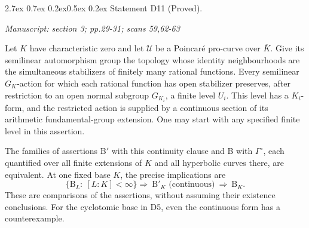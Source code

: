 \documentclass[11pt,a4paper]{article}
\makeatletter
\newcommand{\passage}[1]{\par\smallskip\noindent\textit{Manuscript: #1}\par\smallskip}
\renewcommand\paragraph{\@startsection{paragraph}{4}{\z@}%
  {2.7ex \@plus 0.7ex \@minus 0.2ex}{0.5ex \@plus 0.2ex}%
  {\normalfont\normalsize\bfseries}}
\makeatother
\begin{document}
\paragraph{Statement D11 (Proved).}\label{res:D11}
\passage{section 3; pp.29-31; scans 59,62-63}

Let $K$ have characteristic zero and let $\mathcal U$ be a Poincar\'e
pro-curve over $\overline K$.  Give its semilinear automorphism group
the topology whose identity neighbourhoods are the simultaneous
stabilizers of finitely many rational functions.  Every semilinear
$G_K$-action for which each rational function has open stabilizer
preserves, after restriction to an open normal subgroup $G_{K_i}$, a
finite level $U_i$.  This level has a $K_i$-form, and the restricted
action is supplied by a continuous section of its arithmetic
fundamental-group extension.  One may start with any specified finite
level in this assertion.

The families of assertions B$'$ with this continuity clause and B with
$\Gamma^\circ$, each quantified over all finite extensions of $K$ and
all hyperbolic curves there, are equivalent.  At one fixed base $K$,
the precise implications are
\[
 \{\mathrm B_L:\ [L:K]<\infty\} \Longrightarrow\
 \mathrm B'_K\text{ (continuous)}\ \Longrightarrow\ \mathrm B_K.
\]
These are comparisons of the assertions, without assuming their
existence conclusions.  For the cyclotomic base in D5, even the
continuous form has a counterexample.
\end{document}
